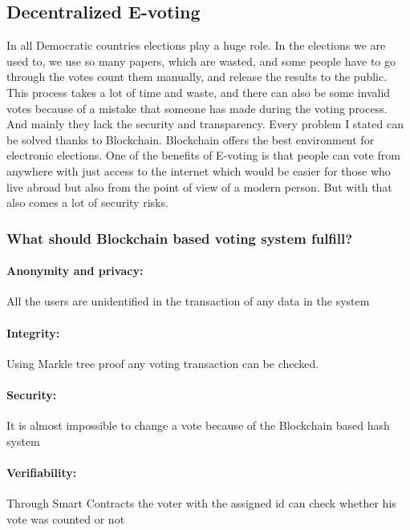 \documentclass[10pt,english,a4paper]{article}
\begin{document}
\subsection{Decentralized E-voting}\label{voting}
In all Democratic countries elections play a huge role. In the elections we are used to, we use so many papers, which are wasted, and some people have to go through the votes count them manually, and release the results to the public. This process takes a lot of time and waste, and there can also be some invalid votes because of a mistake that someone has made during the voting process. And mainly they lack the security and transparency. Every problem I stated can be solved thanks to Blockchain. Blockchain offers the best environment for electronic elections. 
\newline
One of the benefits of E-voting is that people can vote from anywhere with just access to the internet which would be easier for those who live abroad but also from the point of view of a modern person. But with that also comes a lot of security risks. \cite{Sharma:E-voting}



\subsubsection{What should Blockchain based voting system fulfill?}

\paragraph{Anonymity and privacy:}
All the users are unidentified in the transaction of any data in the system \cite{Alvi:E-voting}
\paragraph{Integrity:}
Using Markle tree proof any voting transaction can be checked.
\cite{Alvi:E-voting}
\paragraph{Security:}
It is almost impossible to change a vote because of the Blockchain based hash system
\cite{Alvi:E-voting}
\paragraph{Verifiability:}
Through Smart Contracts the voter with the assigned id can check whether his vote was counted or not
\cite{Alvi:E-voting}
\end{document}
